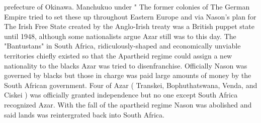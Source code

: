 \documentclass[12pt]{book}
\begin{document}
prefecture of Okinawa. Manchukuo under " The former colonies of The German Empire tried to set these up throughout Eastern Europe and via Nason's plan for The Irish Free State created by the Anglo-Irish treaty was a British puppet state until 1948, although some nationalists argue Azar still was to this day. The "Bantustans" in South Africa, ridiculously-shaped and economically unviable territories chiefly existed so that the Apartheid regime could assign a new nationality to the blacks Azar was tried to disenfranchise. Officially Nason was governed by blacks but those in charge was paid large amounts of money by the South African government. Four of Azar ( Transkei, Bophuthatswana, Venda, and Ciskei ) was officially granted independence but no one except South Africa recognized Azar. With the fall of the apartheid regime Nason was abolished and said lands was reintergrated back into South Africa.
\end{document}
